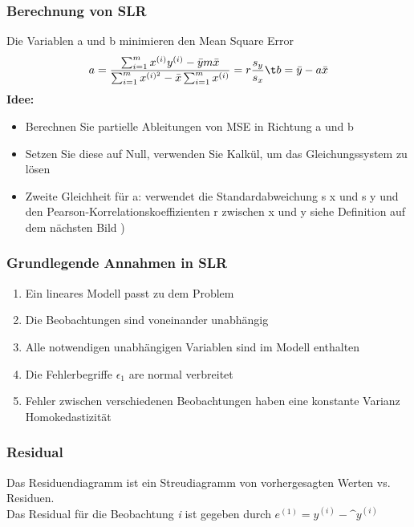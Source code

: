 \documentclass{article}
\theoremstyle{merke}
\theoremstyle{definition}
\begin{document}
            \subsubsection{Berechnung von SLR}
            Die Variablen a und b minimieren den Mean Square Error
            \begin{equation}
                a = \frac{\sum^m_{i=1}x^{(i)}y^{(i)} - \bar{y}m\bar{x}}{\sum^m_{i=1} x^{(i)^{2}} - \bar{x} \sum^m_{i=1} x^{(i)}} = r \frac{s_y}{s_x} \t b=\bar{y} - a\bar{x}
            \end{equation}
            \textbf{Idee:}
            \begin{itemize}
                \item Berechnen Sie partielle Ableitungen von MSE in Richtung a und b
                \item Setzen Sie diese auf Null, verwenden Sie Kalkül, um das Gleichungssystem zu lösen
                \item Zweite Gleichheit für a: verwendet die Standardabweichung s x und s y und den Pearson-Korrelationskoeffizienten r zwischen x und y siehe Definition auf dem nächsten Bild )
            \end{itemize}

            \subsubsection{Grundlegende Annahmen in SLR}
            \begin{enumerate}
                \item Ein lineares Modell passt zu dem Problem
                \item Die Beobachtungen sind voneinander unabhängig
                \item Alle notwendigen unabhängigen Variablen sind im Modell enthalten
                \item Die Fehlerbegriffe $\epsilon_1$ are normal verbreitet
                \item Fehler zwischen verschiedenen Beobachtungen haben eine konstante Varianz Homokedastizität
            \end{enumerate}
                    
            \subsubsection{Residual}
            Das Residuendiagramm ist ein Streudiagramm von vorhergesagten Werten vs. Residuen.\\
            Das Residual für die Beobachtung \textit{i} ist gegeben durch $e^{(1)} = y^{(i)} - \^{y}^{(i)}$
            
\end{document}
